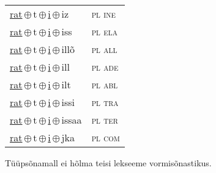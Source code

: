 \begin{minipage}{\textwidth}
\begin{sideways}
\begin{tabular}{l l}
\underline{rat}\,$\oplus$\,t\,$\oplus$\,\underline{i}\,$\oplus$\,iz & \textsc{ pl ine } \\
\underline{rat}\,$\oplus$\,t\,$\oplus$\,\underline{i}\,$\oplus$\,iss & \textsc{ pl ela } \\
\underline{rat}\,$\oplus$\,t\,$\oplus$\,\underline{i}\,$\oplus$\,illõ & \textsc{ pl all } \\
\underline{rat}\,$\oplus$\,t\,$\oplus$\,\underline{i}\,$\oplus$\,ill & \textsc{ pl ade } \\
\underline{rat}\,$\oplus$\,t\,$\oplus$\,\underline{i}\,$\oplus$\,ilt & \textsc{ pl abl } \\
\underline{rat}\,$\oplus$\,t\,$\oplus$\,\underline{i}\,$\oplus$\,issi & \textsc{ pl tra } \\
\underline{rat}\,$\oplus$\,t\,$\oplus$\,\underline{i}\,$\oplus$\,issaa & \textsc{ pl ter } \\
\underline{rat}\,$\oplus$\,t\,$\oplus$\,\underline{i}\,$\oplus$\,jka & \textsc{ pl com } \\
\end{tabular}
\end{sideways}
\label{tab:tüüpsõnamall-ratiz}

\end{minipage}

 
\vspace{1em}
\noindent Tüüpsõnamall  ei hõlma teisi lekseeme vormi\-sõnastikus.
